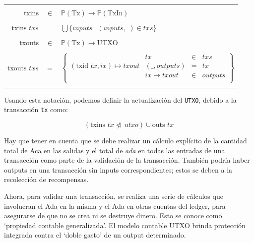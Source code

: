 \documentclass[12pt]{book}
\begin{document}
\begin{center}
	\begin{tabular}{|r c l|}
		\hline               &       &                                                             \\
		$\text{txins}$       & $\in$ & $\mathbb{P}(\text{Tx}) \rightarrow \mathbb{P}(\text{TxIn})$ \\&&\\

		$\text{txins } txs$  & =     & $\bigcup \{ inputs\ |\ (inputs, \_ ) \in txs$\}             \\&&\\

		$\text{txouts}$      & $\in$ & $\mathbb{P}(\text{Tx}) \rightarrow \text{UTXO}$             \\&&\\

		$\text{txouts } txs$ & =     &
		$\left \{
			\begin{array}{l|lcl}
				                                    & tx               & \in & txs     \\
				(\text{txid } tx, ix) \mapsto txout & (\_, outputs)    & =   & tx      \\
				                                    & ix \mapsto txout & \in & outputs \\
			\end{array}
		\right \} $                                                                                 \\&&\\
		\hline
	\end{tabular}
\end{center}

Usando esta notación, podemos definir la actualización del \texttt{UTXO}, debido a la transacción \texttt{tx} como:

\[ (\text{txins } tx\ntriangleleft\ utxo) \cup\text{outs } tx \]

Hay que tener en cuenta que se debe realizar un cálculo explícito de la cantidad total de Aca en las salidas y el total de \textit{ada} en todas las entradas de una transacción como parte de la validación de la transacción. También podría haber outputs en una transacción sin inputs correspondientes; estos se deben a la recolección de recompensas.

Ahora, para validar una transacción, se realiza una serie de cálculos que involucran el Ada en la misma y el Ada en otras cuentas del ledger, para asegurarse de que no se crea ni se destruye dinero. Esto se conoce como `propiedad contable generalizada'. El modelo contable UTXO brinda protección integrada contra el `doble gasto' de un output determinado.
\end{document}
